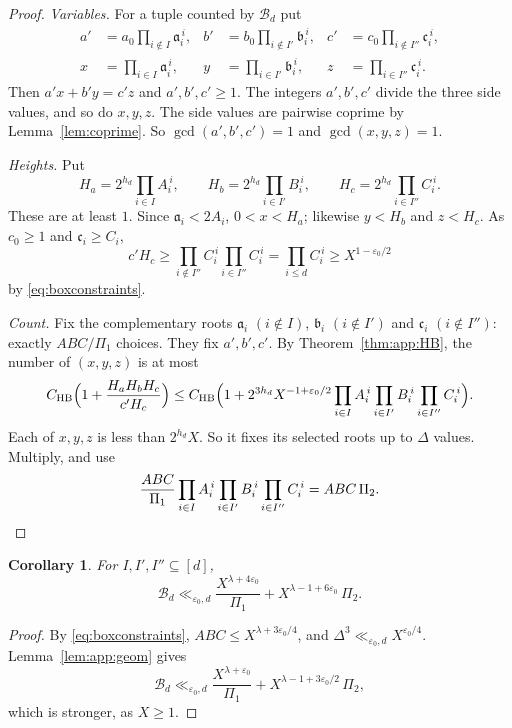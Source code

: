 \documentclass{amsart}
\newtheorem{corollary}[lemma]{Corollary}
\theoremstyle{definition}
\theoremstyle{plain}
\numberwithin{equation}{section}
\numberwithin{table}{section}
\begin{document}
\begin{proof}
\emph{Variables.} For a tuple counted by $\mathcal B_d$ put
\[
 \begin{aligned}
 a'&=a_0\prod_{i\notin I}\mathfrak a_i^{\,i},&
 b'&=b_0\prod_{i\notin I'}\mathfrak b_i^{\,i},&
 c'&=c_0\prod_{i\notin I''}\mathfrak c_i^{\,i},\\
 x&=\prod_{i\in I}\mathfrak a_i^{\,i},&
 y&=\prod_{i\in I'}\mathfrak b_i^{\,i},&
 z&=\prod_{i\in I''}\mathfrak c_i^{\,i}.
 \end{aligned}
\]
Then $a'x+b'y=c'z$ and $a',b',c'\ge1$. The integers $a',b',c'$ divide the
three side values, and so do $x,y,z$. The side values are pairwise coprime by
Lemma~\ref{lem:coprime}. So $\gcd(a',b',c')=1$ and $\gcd(x,y,z)=1$.

\emph{Heights.} Put
\[
 H_a=2^{h_d}\prod_{i\in I}A_i^{\,i},\qquad
 H_b=2^{h_d}\prod_{i\in I'}B_i^{\,i},\qquad
 H_c=2^{h_d}\prod_{i\in I''}C_i^{\,i}.
\]
These are at least $1$. Since $\mathfrak a_i<2A_i$, $0<x<H_a$; likewise
$y<H_b$ and $z<H_c$. As $c_0\ge1$ and $\mathfrak c_i\ge C_i$,
\[
 c'H_c\ge\prod_{i\notin I''}C_i^{\,i}\prod_{i\in I''}C_i^{\,i}
 =\prod_{i\le d}C_i^{\,i}\ge X^{1-\varepsilon_0/2}
\]
by \eqref{eq:boxconstraints}.

\emph{Count.} Fix the complementary roots $\mathfrak a_i$ $(i\notin I)$,
$\mathfrak b_i$ $(i\notin I')$ and $\mathfrak c_i$ $(i\notin I'')$: exactly
$ABC/\Pi_1$ choices. They fix $a',b',c'$. By Theorem~\ref{thm:app:HB}, the
number of $(x,y,z)$ is at most
\[
 C_{\rm HB}\Bigl(1+\frac{H_aH_bH_c}{c'H_c}\Bigr)
 \le C_{\rm HB}\Bigl(1+2^{3h_d}X^{-1+\varepsilon_0/2}
 \prod_{i\in I}A_i^{\,i}\prod_{i\in I'}B_i^{\,i}\prod_{i\in I''}C_i^{\,i}\Bigr).
\]
Each of $x,y,z$ is less than $2^{h_d}X$. So it fixes its selected roots up to
$\Delta$ values. Multiply, and use
\[
 \frac{ABC}{\Pi_1}\prod_{i\in I}A_i^{\,i}\prod_{i\in I'}B_i^{\,i}
 \prod_{i\in I''}C_i^{\,i}=ABC\,\Pi_2 .\qedhere
\]
\end{proof}

\begin{corollary}\label{cor:app:geom}
For $I,I',I''\subseteq[d]$,
\[
 \mathcal B_d\ll_{\varepsilon_0,d}\frac{X^{\lambda+4\varepsilon_0}}{\Pi_1}
 +X^{\lambda-1+6\varepsilon_0}\,\Pi_2 .
\]
\end{corollary}

\begin{proof}
By \eqref{eq:boxconstraints}, $ABC\le X^{\lambda+3\varepsilon_0/4}$, and
$\Delta^3\ll_{\varepsilon_0,d}X^{\varepsilon_0/4}$. Lemma~\ref{lem:app:geom}
gives
\[
 \mathcal B_d\ll_{\varepsilon_0,d}\frac{X^{\lambda+\varepsilon_0}}{\Pi_1}
 +X^{\lambda-1+3\varepsilon_0/2}\,\Pi_2 ,
\]
which is stronger, as $X\ge1$.
\end{proof}
\end{document}
